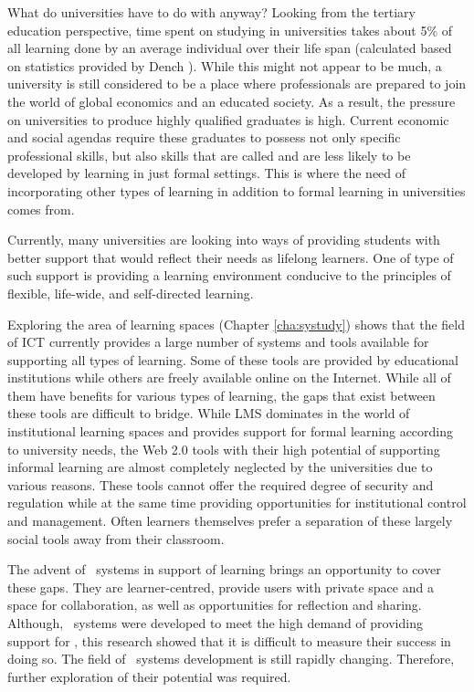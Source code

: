 What do universities have to do with \LLLs anyway? Looking from the tertiary
education perspective, time spent on studying in universities takes about 5\% of
all learning done by an average individual over their life span (calculated
based on statistics provided by Dench \citeyearpar[pp.~28-37]{Dench2010}). While
this might not appear to be much, a university is still considered to be a
place where professionals are prepared to join the world of global economics
and an educated society. As a result, the pressure on universities to produce
highly qualified graduates is high. Current economic and social agendas require
these graduates to possess not only specific professional skills, but also
skills that are called \LLLs and are less likely to be developed by learning in
just formal settings. This is where the need of incorporating other types of
learning in addition to formal learning in universities comes from.

Currently, many universities are looking into ways of providing students
with better support that would reflect their needs as lifelong learners. One of
type of such support is providing a learning environment conducive to the
principles of flexible, life-wide, and self-directed learning.


Exploring the area of learning spaces (Chapter \ref{cha:systudy}) shows that
the field of ICT currently provides a large number of systems and tools
available for supporting all types of learning. Some of these tools are provided
by educational institutions while others are freely available online on the
Internet. While all of them have benefits for various types of learning, the
gaps that exist between these tools are difficult to bridge. While LMS dominates
in the world of institutional learning spaces and provides support for formal
learning according to university needs, the Web 2.0 tools with their high
potential of supporting informal learning are almost completely neglected by the
universities due to various reasons. These tools cannot offer the required
degree of security and regulation while at the same time providing opportunities
for institutional control and management. Often learners themselves prefer a
separation of these largely social tools away from their classroom.

The advent of \ep~systems in support of learning brings an opportunity to cover
these gaps. They are learner-centred, provide users with private space and a
space for collaboration, as well as opportunities for reflection and sharing.
Although, \ep~systems were developed to meet the high demand of providing
support for \LLLsn, this research showed that it is difficult to measure their
success in doing so. The field of \ep~systems development is still rapidly
changing. Therefore, further exploration of their potential was required.

